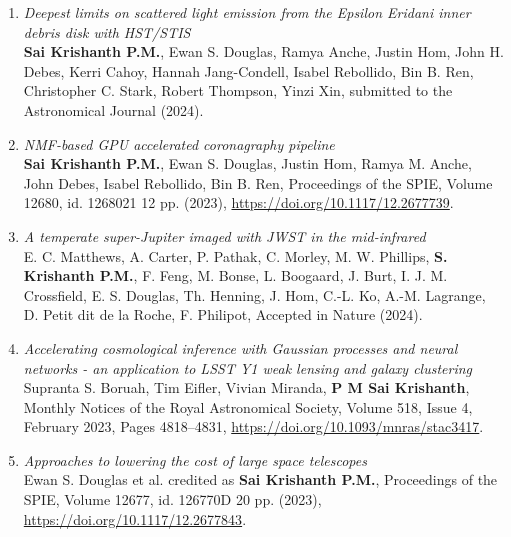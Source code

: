 \documentclass[11pt]{article}
\begin{document}
\begin{enumerate} 
    \item \textit{Deepest limits on scattered light emission from the Epsilon Eridani inner debris disk with HST/STIS} \\
    \textbf{Sai Krishanth P.M.}, Ewan S. Douglas, Ramya Anche, Justin Hom, John H. Debes, Kerri Cahoy, Hannah Jang-Condell, 
	Isabel Rebollido, Bin B. Ren, Christopher C. Stark, Robert Thompson, Yinzi Xin, submitted to the Astronomical Journal (2024).
    \item \textit{NMF-based GPU accelerated coronagraphy pipeline}\\ \textbf{Sai Krishanth P.M.}, Ewan S. Douglas, Justin Hom, Ramya M. Anche, John Debes, Isabel Rebollido, Bin B. Ren, Proceedings of the SPIE, Volume 12680, id. 1268021 12 pp. (2023), \url{https://doi.org/10.1117/12.2677739}.
    \item \textit{A temperate super-Jupiter imaged with JWST in the mid-infrared}\\ E. C. Matthews, A. Carter, P. Pathak, C. Morley, M. W. Phillips, \textbf{S. Krishanth P.M.}, F. Feng, M. Bonse, L. Boogaard, J. Burt, I. J. M. Crossfield, E. S. Douglas, Th. Henning, J. Hom, C.-L. Ko, A.-M. Lagrange, D. Petit dit de la Roche, F. Philipot, Accepted in Nature (2024).
    \item \textit{Accelerating cosmological inference with Gaussian processes and neural networks - an application to LSST Y1 weak lensing and galaxy clustering}\\
    Supranta S. Boruah, Tim Eifler, Vivian Miranda, \textbf{P M Sai Krishanth}, Monthly Notices of the Royal Astronomical Society, Volume 518, Issue 4, February 2023, Pages 4818–4831, \url{https://doi.org/10.1093/mnras/stac3417}. 
    \item \textit{Approaches to lowering the cost of large space telescopes}\\
    Ewan S. Douglas et al. credited as \textbf{Sai Krishanth P.M.}, Proceedings of the SPIE, Volume 12677, id. 126770D 20 pp. (2023), \url{https://doi.org/10.1117/12.2677843}.
\end{enumerate}
\end{document}
